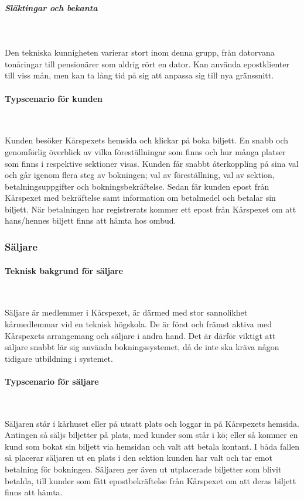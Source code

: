 \documentclass[a4paper, twoside, 11pt, titlepage]{article}
\begin{document}
			\subparagraph{\emph{Släktingar och bekanta}}\

				Den tekniska kunnigheten varierar stort inom denna grupp, från datorvana tonåringar till pensionärer som aldrig rört en dator. Kan använda epostklienter till viss mån, men kan ta lång tid på sig att anpassa sig till nya gränssnitt.

			\paragraph{Typscenario för kunden}\

			Kunden besöker Kårspexets hemsida och klickar på boka biljett. En snabb och genomförlig överblick av vilka föreställningar som finns och hur många platser som finns i respektive sektioner visas. Kunden får snabbt återkoppling på sina val och går igenom flera steg av bokningen; val av föreställning, val av sektion, betalningsuppgifter och bokningsbekräftelse. Sedan får kunden epost från Kårspexet med bekräftelse samt information om betalmedel och betalar sin biljett. När betalningen har registrerats kommer ett epost från Kårspexet om att hans/hennes biljett finns att hämta hos ombud.

		\subsubsection{Säljare}



			\paragraph{Teknisk bakgrund för säljare}\

			Säljare är medlemmer i Kårspexet, är därmed med stor sannolikhet kårmedlemmar vid en teknisk högskola. De är först och främst aktiva med Kårspexets arrangemang och säljare i andra hand. Det är därför viktigt att säljare snabbt lär sig använda bokningssystemet, då de inte ska kräva någon tidigare utbildning i systemet.

			\paragraph{Typscenario för säljare}\

			Säljaren står i kårhuset eller på utsatt plats och loggar in på Kårspexets hemsida. Antingen så säljs biljetter på plats, med kunder som står i kö; eller så kommer en kund som bokat sin biljett via hemsidan och valt att betala kontant. I båda fallen så placerar säljaren ut en plats i den sektion kunden har valt och tar emot betalning för bokningen. Säljaren ger även ut utplacerade biljetter som blivit betalda, till kunder som fått epostbekräftelse från Kårspexet om att deras biljett finns att hämta.
\end{document}
